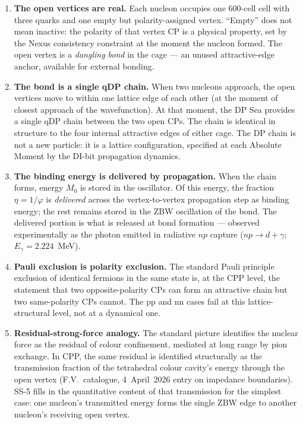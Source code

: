 \documentclass[11pt,letterpaper]{article}
\newcommand{\phig}{\varphi}
\newcommand{\Mzero}{M_0}
\begin{document}
\begin{enumerate}
\item \textbf{The open vertices are real.} Each nucleon occupies one 600-cell cell with three quarks and one empty but polarity-assigned vertex. ``Empty'' does not mean inactive: the polarity of that vertex CP is a physical property, set by the Nexus consistency constraint at the moment the nucleon formed. The open vertex is a \emph{dangling bond} in the cage --- an unused attractive-edge anchor, available for external bonding.

\item \textbf{The bond is a single qDP chain.} When two nucleons approach, the open vertices move to within one lattice edge of each other (at the moment of closest approach of the wavefunction). At that moment, the DP Sea provides a single qDP chain between the two open CPs. The chain is identical in structure to the four internal attractive edges of either cage. The DP chain is not a new particle: it is a lattice configuration, specified at each Absolute Moment by the DI-bit propagation dynamics.

\item \textbf{The binding energy is delivered by propagation.} When the chain forms, energy $\Mzero$ is stored in the oscillator. Of this energy, the fraction $\eta = 1/\phig$ is \emph{delivered} across the vertex-to-vertex propagation step as binding energy; the rest remains stored in the ZBW oscillation of the bond. The delivered portion is what is released at bond formation --- observed experimentally as the photon emitted in radiative $np$ capture ($np \to d + \gamma$; $E_\gamma = 2.224$~MeV).

\item \textbf{Pauli exclusion is polarity exclusion.} The standard Pauli principle exclusion of identical fermions in the same state is, at the CPP level, the statement that two opposite-polarity CPs can form an attractive chain but two same-polarity CPs cannot. The pp and nn cases fail at this lattice-structural level, not at a dynamical one.

\item \textbf{Residual-strong-force analogy.} The standard picture identifies the nuclear force as the residual of colour confinement, mediated at long range by pion exchange. In CPP, the same residual is identified structurally as the transmission fraction of the tetrahedral colour cavity's energy through the open vertex (F.V.\ catalogue, 4~April~2026 entry on impedance boundaries). SS-5 fills in the quantitative content of that transmission for the simplest case: one nucleon's transmitted energy forms the single ZBW edge to another nucleon's receiving open vertex.
\end{enumerate}
\end{document}
